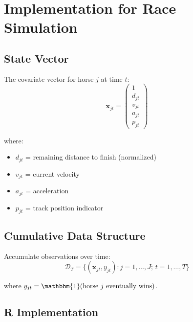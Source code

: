 \documentclass[11pt,letterpaper]{article}
\theoremstyle{definition}
\begin{document}
\section{Implementation for Race Simulation}

\subsection{State Vector}

The covariate vector for horse $j$ at time $t$:
\begin{equation}
    \mathbf{x}_{jt} = \begin{pmatrix} 1 \\ d_{jt} \\ v_{jt} \\ a_{jt} \\ p_{jt} \end{pmatrix}
\end{equation}

where:
\begin{itemize}
    \item $d_{jt}$ = remaining distance to finish (normalized)
    \item $v_{jt}$ = current velocity
    \item $a_{jt}$ = acceleration
    \item $p_{jt}$ = track position indicator
\end{itemize}

\subsection{Cumulative Data Structure}

Accumulate observations over time:
\begin{equation}
    \mathcal{D}_T = \{(\mathbf{x}_{jt}, y_{jt}) : j = 1, \ldots, J; \, t = 1, \ldots, T\}
\end{equation}

where $y_{jt} = \mathbbm{1}(\text{horse } j \text{ eventually wins})$.

\subsection{R Implementation}
\end{document}
